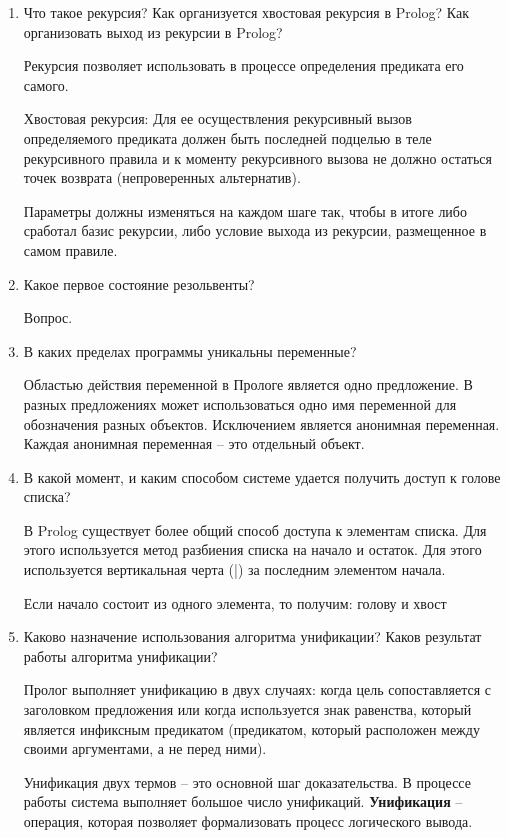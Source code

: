 \documentclass[a4paper,14pt]{extreport} %
\begin{document}
\begin{enumerate} 

\item Что такое рекурсия? Как организуется хвостовая рекурсия в Prolog? Как организовать выход из рекурсии в Prolog?

Рекурсия позволяет использовать в процессе определения предиката его самого. 

Хвостовая рекурсия: Для ее осуществления рекурсивный вызов определяемого предиката должен быть последней подцелью в теле рекурсивного правила и к моменту рекурсивного вызова не должно остаться точек возврата (непроверенных альтернатив). 

Параметры должны изменяться на каждом шаге так, чтобы в итоге либо сработал базис рекурсии, либо условие выхода из рекурсии, размещенное в самом правиле.

\item Какое первое состояние резольвенты?

Вопрос. 

\item В каких пределах программы уникальны переменные? 

Областью действия переменной в Прологе является одно предложение. В разных предложениях может использоваться одно имя переменной для обозначения разных объектов. Исключением является анонимная переменная. Каждая анонимная переменная -- это отдельный объект.

\item В какой момент, и каким способом системе удается получить доступ к голове списка?

В Prolog существует более общий способ доступа к элементам списка. Для этого используется метод разбиения списка на начало и остаток. Для этого используется вертикальная черта (|) за последним элементом начала. 

Если начало состоит из одного элемента, то получим: голову и хвост

\item Каково назначение использования алгоритма унификации? Каков результат работы алгоритма унификации? 

Пролог выполняет унификацию в двух случаях: когда цель сопоставляется с заголовком предложения или когда используется знак равенства, который является инфиксным предикатом (предикатом, который расположен между своими аргументами, а не перед ними).

Унификация двух термов -- это основной шаг доказательства. В процессе работы система выполняет большое число унификаций.
\textbf{Унификация} -- операция, которая позволяет формализовать процесс логического вывода. 


\end{enumerate}
\end{document}
